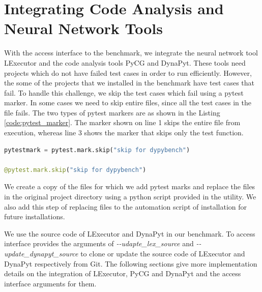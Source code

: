 \section{Integrating Code Analysis and Neural Network Tools}
\label{impl:Integrating Tools}
With the access interface to the benchmark, we integrate the neural network tool LExecutor and the code analysis tools PyCG and DynaPyt.
These tools need projects which do not have failed test cases in order to run efficiently.
However, the some of the projects that we installed in the benchmark have test cases that fail.
To handle this challenge, we skip the test cases which fail using a pytest marker.
In some cases we need to skip entire files, since all the test cases in the file fails.
The two types of pytest markers are as shown in the Listing \ref{code:pytest_marker}.
The marker shown on line 1 skips the entire file from execution, whereas line 3 shows the marker that skips only the test function.
\begin{lstlisting}[caption=Skip Test Case using Pytest Marker,label=code:pytest_marker,language=Python]
pytestmark = pytest.mark.skip("skip for dypybench")

@pytest.mark.skip("skip for dypybench")
\end{lstlisting}

We create a copy of the files for which we add pytest marks and replace the files in the original project directory using a python script provided in the utility.
We also add this step of replacing files to the automation script of installation for future installations.

We use the source code of LExecutor and DynaPyt in our benchmark.
To access interface provides the arguments of \textit{\--\--udapte\_lex\_source} and \textit{\--\--update\_dynapyt\_source} to clone or update the source code of LExecutor and DynaPyt respectively from Git.
The following sections give more implementation details on the integration of LExecutor, PyCG and DynaPyt and the access interface arguments for them.

